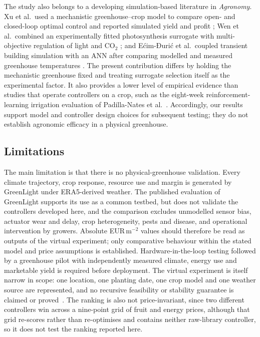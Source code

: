 The study also belongs to a developing simulation-based literature in
\textit{Agronomy}. Xu et al.\ used a mechanistic greenhouse--crop model to compare
open- and closed-loop optimal control and reported simulated yield and profit
\cite{xu2023agronomy}; Wen et al.\ combined an experimentally fitted photosynthesis
surrogate with multi-objective regulation of light and CO$_2$
\cite{wen2022agronomy}; and E{\'c}im-Đuri{\'c} et al.\ coupled transient building
simulation with an ANN after comparing modelled and measured greenhouse temperatures
\cite{ecimduric2024}. The present contribution differs by holding the mechanistic
greenhouse fixed and treating surrogate selection itself as the experimental factor. It
also provides a lower level of empirical evidence than studies that operate controllers
on a crop, such as the eight-week reinforcement-learning irrigation evaluation of
Padilla-Nates et al.\ \cite{padillanates2025}. Accordingly, our results support model and
controller design choices for subsequent testing; they do not establish agronomic efficacy
in a physical greenhouse.

\subsection{Limitations}
\label{sec:disc-limitations}

The main limitation is that there is no physical-greenhouse validation. Every climate
trajectory, crop response, resource use and margin is generated by GreenLight under
ERA5-derived weather. The published evaluation of GreenLight supports its use as a common
testbed, but does not validate the controllers developed here, and the comparison excludes
unmodelled sensor bias, actuator wear and delay, crop heterogeneity, pests and disease, and
operational intervention by growers. Absolute EUR\,m$^{-2}$ values should therefore be read
as outputs of the virtual experiment; only comparative behaviour within the stated model
and price assumptions is established. Hardware-in-the-loop testing followed by a greenhouse
pilot with independently measured climate, energy use and marketable yield is required
before deployment. The virtual experiment is itself narrow in scope: one location, one
planting date, one crop model and one weather source are represented, and no recursive
feasibility or stability guarantee is claimed or proved~\cite{mayne2000}. The ranking is
also not price-invariant, since two different controllers win across a nine-point grid of
fruit and energy prices, although that grid re-scores rather than re-optimises and contains
neither raw-library controller, so it does not test the ranking reported here.

